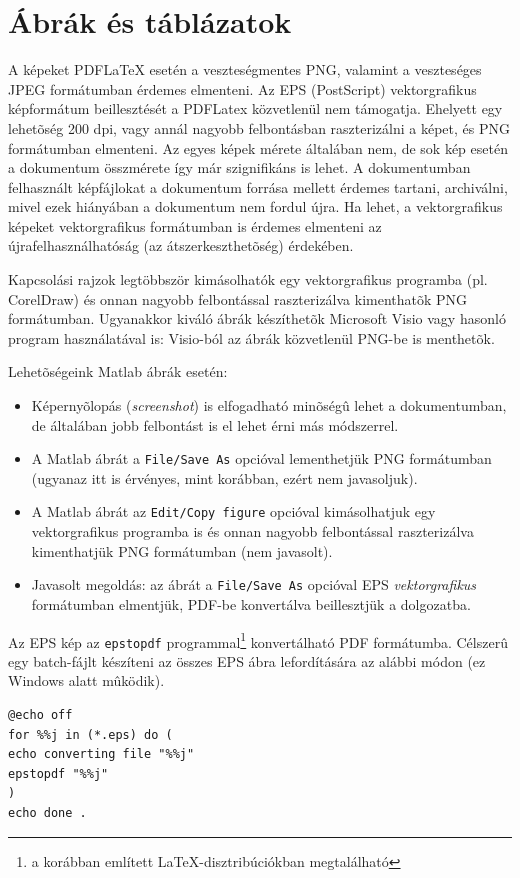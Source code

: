 \section{Ábrák és táblázatok}
A képeket PDFLaTeX esetén a veszteségmentes PNG, valamint a veszteséges JPEG formátumban érdemes elmenteni. Az EPS (PostScript) vektorgrafikus képformátum beillesztését a PDFLatex közvetlenül nem támogatja. Ehelyett egy lehetõség 200 dpi, vagy annál nagyobb felbontásban raszterizálni a képet, és PNG formátumban elmenteni. Az egyes képek mérete általában nem, de sok kép esetén a dokumentum összmérete így már szignifikáns is lehet. A dokumentumban felhasznált képfájlokat a dokumentum forrása mellett érdemes tartani, archiválni, mivel ezek hiányában a dokumentum nem fordul újra. Ha lehet, a vektorgrafikus képeket vektorgrafikus formátumban is érdemes elmenteni az újrafelhasználhatóság (az átszerkeszthetõség) érdekében.

Kapcsolási rajzok legtöbbször kimásolhatók egy vektorgrafikus programba (pl. CorelDraw) és onnan nagyobb felbontással raszterizálva kimenthatõk PNG formátumban. Ugyanakkor kiváló ábrák készíthetõk Microsoft Visio vagy hasonló program használatával is: Visio-ból az ábrák közvetlenül PNG-be is menthetõk.

Lehetõségeink Matlab ábrák esetén:
\begin{itemize}
	\item Képernyõlopás (\emph{screenshot}) is elfogadható minõségû lehet a dokumentumban, de általában jobb felbontást is el lehet érni más módszerrel.
	\item A Matlab ábrát a \verb+File/Save As+ opcióval lementhetjük PNG formátumban (ugyanaz itt is érvényes, mint korábban, ezért nem javasoljuk).
	\item A Matlab ábrát az \verb+Edit/Copy figure+ opcióval kimásolhatjuk egy vektorgrafikus programba is és onnan nagyobb felbontással raszterizálva kimenthatjük PNG formátumban (nem javasolt).
	\item Javasolt megoldás: az ábrát a \verb+File/Save As+ opcióval EPS \emph{vektorgrafikus} formátumban elmentjük, PDF-be konvertálva beillesztjük a dolgozatba.
\end{itemize}
Az EPS kép az \verb+epstopdf+ programmal\footnote{a korábban említett \LaTeX-disztribúciókban megtalálható} konvertálható PDF formátumba. Célszerû egy batch-fájlt készíteni az összes EPS ábra lefordítására az alábbi módon (ez Windows alatt mûködik).
\begin{lstlisting}[frame=single,float=!ht]
@echo off
for %%j in (*.eps) do (
echo converting file "%%j"
epstopdf "%%j"
)
echo done .
\end{lstlisting}

